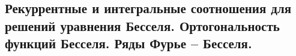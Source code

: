 \subsection{Рекуррентные и интегральные соотношения для решений уравнения Бесселя. Ортогональность функций Бесселя. Ряды Фурье – Бесселя.}